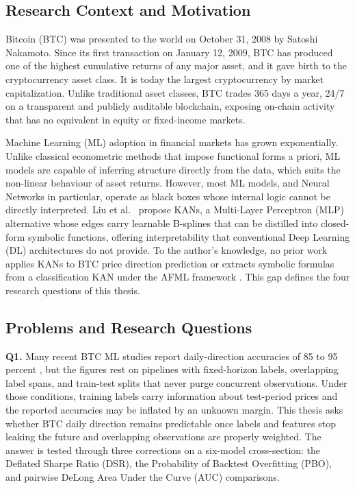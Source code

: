 \documentclass[12pt,a4paper,oneside]{article}
\begin{document}
\subsection{Research Context and Motivation}\label{subsec:context}


Bitcoin (BTC) was presented to the world on October 31, 2008 by Satoshi Nakamoto. Since its first transaction on January 12, 2009, BTC has produced one of the highest cumulative returns of any major asset, and it gave birth to the cryptocurrency asset class. It is today the largest cryptocurrency by market capitalization. Unlike traditional asset classes, BTC trades 365 days a year, 24/7 on a transparent and publicly auditable blockchain, exposing on-chain activity that has no equivalent in equity or fixed-income markets.


Machine Learning (ML) adoption in financial markets has grown exponentially. Unlike classical econometric methods that impose functional forms a priori, ML models are capable of inferring structure directly from the data, which suits the non-linear behaviour of asset returns. However, most ML models, and Neural Networks in particular, operate as black boxes whose internal logic cannot be directly interpreted. Liu et al.\ \citeyearpar{liu_kan_2024} propose KANs, a Multi-Layer Perceptron (MLP) alternative whose edges carry learnable B-splines that can be distilled into closed-form symbolic functions, offering interpretability that conventional Deep Learning (DL) architectures do not provide. To the author's knowledge, no prior work applies KANs to BTC price direction prediction or extracts symbolic formulas from a classification KAN under the AFML framework \citep{lopez_de_prado_2018}. This gap defines the four research questions of this thesis.


\subsection{Problems and Research Questions}\label{subsec:objectives}

\textbf{Q1.} Many recent BTC ML studies report daily-direction accuracies of 85 to 95 percent \citep{omole_enke_2024}, but the figures rest on pipelines with fixed-horizon labels, overlapping label spans, and train-test splits that never purge concurrent observations. Under those conditions, training labels carry information about test-period prices and the reported accuracies may be inflated by an unknown margin. This thesis asks whether BTC daily direction remains predictable once labels and features stop leaking the future and overlapping observations are properly weighted. The answer is tested through three corrections on a six-model cross-section: the Deflated Sharpe Ratio (DSR), the Probability of Backtest Overfitting (PBO), and pairwise DeLong Area Under the Curve (AUC) comparisons.
\end{document}
